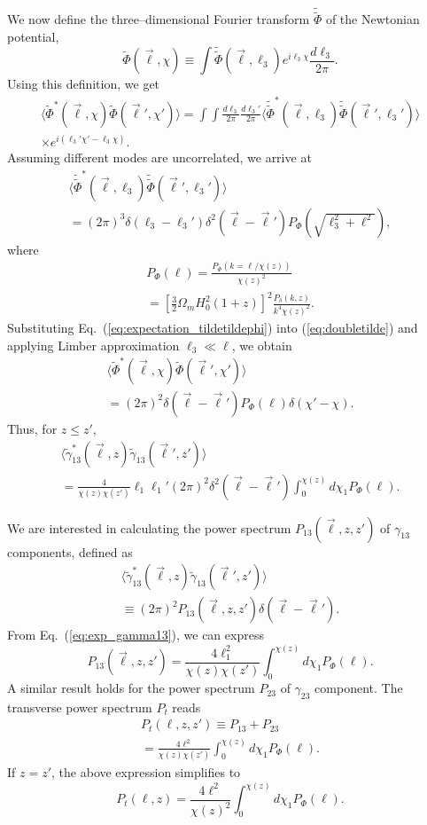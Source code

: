 \documentclass[aps,prd,twocolumn,floatfix,showpacs,superscriptaddress,nofootinbib]{revtex4-1}
\newcommand{\beq}{\begin{equation}}
\newcommand{\eeq}{\end{equation}}
\newcommand{\bga}{\begin{gathered}}
\newcommand{\ega}{\end{gathered}}
\begin{document}
We now define the three--dimensional Fourier transform $\widetilde{\widetilde\Phi}$ of the Newtonian potential,
\beq
\widetilde{\Phi}(\vec{\ell},\chi)\equiv\int\widetilde{\widetilde{\Phi}}(\vec{\ell},\ell_3)e^{i\ell_3\chi}\frac{d\ell_3}{2\pi}.
\eeq
Using this definition, we get
\beq
\bga
\langle\widetilde{\Phi}^*(\vec{\ell},\chi)\widetilde{\Phi}(\vec{\ell}',\chi')\rangle=\int\int\frac{d\ell_3}{2\pi}\frac{d\ell_3'}{2\pi}\langle\widetilde{\widetilde{\Phi}}^*(\vec{\ell},\ell_3)\widetilde{\widetilde{\Phi}}(\vec{\ell}',\ell_3')\rangle\\
\times e^{i(\ell_3'\chi'-\ell_3\chi)}. 
\ega
\label{eq:doubletilde}
\eeq
Assuming different modes are uncorrelated, we arrive at
\beq
\bga
\langle\widetilde{\widetilde{\Phi}}^*(\vec{\ell},\ell_3)\widetilde{\widetilde{\Phi}}(\vec{\ell}',\ell_3')\rangle\\
=(2\pi)^3\delta(\ell_3-\ell_3')\delta^2(\vec{\ell}-\vec{\ell}')P_{\Phi}(\sqrt{\ell_3^2+\ell^2}),
\ega
\label{eq:expectation_tildetildephi}
\eeq
where
\beq
\bga
P_{\Phi}(\ell)=\frac{P_{\Phi}(k=\ell/\chi(z))}{\chi(z)^2}\\
=\left[\frac{3}{2}\Omega_mH_0^2(1+z)\right]^2\frac{P_{\delta}(k,z)}{k^4\chi(z)^2}.
\ega
\eeq
Substituting Eq.~(\ref{eq:expectation_tildetildephi}) into (\ref{eq:doubletilde}) and applying Limber approximation $\ell_3\ll\ell$, we obtain
\beq
\bga
\langle\widetilde{\Phi}^*(\vec{\ell},\chi)\widetilde{\Phi}(\vec{\ell}',\chi')\rangle\\
=(2\pi)^2\delta(\vec{\ell}-\vec{\ell}')P_{\Phi}(\ell)\delta(\chi'-\chi).
\ega
\eeq
Thus, for $z\leq z'$,
\beq
\bga
\langle\widetilde{\gamma}_{13}^*(\vec{\ell},z)\widetilde{\gamma}_{13}(\vec{\ell}',z')\rangle\\
=\frac{4}{\chi(z)\chi(z')}\ell_1\ell_1'(2\pi)^2\delta^2(\vec{\ell}-\vec{\ell}')\int_0^{\chi(z)}d\chi_1P_{\Phi}(\ell).
\ega
\label{eq:exp_gamma13}
\eeq

We are interested in calculating the power spectrum $P_{13}(\vec{\ell},z,z')$ of $\gamma_{13}$ components, defined as
\beq
\bga
\langle\widetilde{\gamma}_{13}^*(\vec{\ell},z)\widetilde{\gamma}_{13}(\vec{\ell}',z')\rangle\\
\equiv(2\pi)^2P_{13}(\vec{\ell},z,z')\delta(\vec{\ell}-\vec{\ell}').
\ega
\eeq
From Eq.~(\ref{eq:exp_gamma13}), we can express
\beq
P_{13}(\vec{\ell},z,z')=\frac{4\ell_1^2}{\chi(z)\chi(z')}\int_0^{\chi(z)}d\chi_1P_{\Phi}(\ell).
\eeq
A similar result holds for the power spectrum $P_{23}$ of $\gamma_{23}$ component. The transverse power spectrum $P_t$ reads
\beq
\bga
P_t(\ell,z,z')\equiv P_{13}+P_{23}\\
=\frac{4\ell^2}{\chi(z)\chi(z')}\int_0^{\chi(z)}d\chi_1P_{\Phi}(\ell).
\ega
\eeq
If $z=z'$, the above expression simplifies to
\beq
P_t(\ell,z)=\frac{4\ell^2}{\chi(z)^2}\int_0^{\chi(z)}d\chi_1P_{\Phi}(\ell).
\label{eq:Pt}
\eeq
\end{document}

